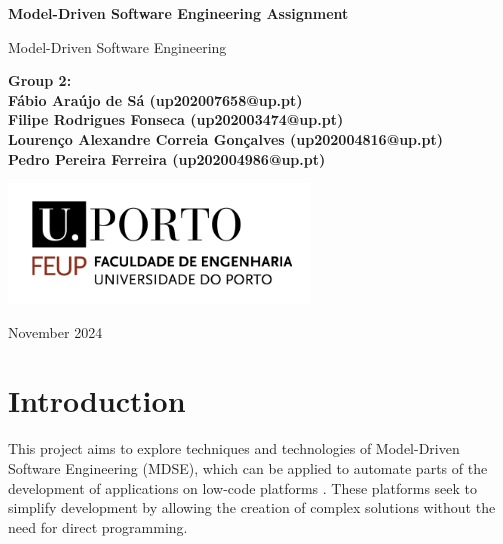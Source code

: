 \documentclass[10pt]{article}
\begin{document}
\begin{titlepage}
   \begin{center}
       \vspace*{1cm}
       {\fontsize{17}{16}\selectfont\textbf{Model-Driven Software Engineering Assignment}}

       \vspace{0.5cm}
        Model-Driven Software Engineering
            
       \vspace{1.5cm}

       \textbf{Group 2:}\\
       \textbf{Fábio Araújo de Sá (up202007658@up.pt)}\\
       \textbf{Filipe Rodrigues Fonseca (up202003474@up.pt)}\\
       \textbf{Lourenço Alexandre Correia Gonçalves (up202004816@up.pt)}\\
       \textbf{Pedro Pereira Ferreira (up202004986@up.pt)}\\
       \vfill
            
       \includegraphics[width=0.6\textwidth]{imgs/FEUP.png}
        
       \vspace{2cm}
            
       November 2024
            
   \end{center}
\end{titlepage}

\tableofcontents
\clearpage

\section{Introduction}

This project aims to explore techniques and technologies of Model-Driven Software Engineering (MDSE), which can be applied to automate parts of the development of applications on low-code platforms \cite{brambilla2017mdse}. These platforms seek to simplify development by allowing the creation of complex solutions without the need for direct programming.
\end{document}
